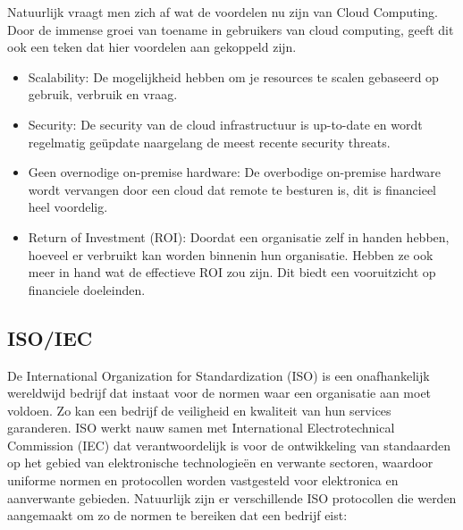 Natuurlijk vraagt men zich af wat de voordelen nu zijn van Cloud Computing. Door de immense groei van toename in gebruikers van cloud computing, geeft dit ook een teken dat hier voordelen aan gekoppeld zijn.

\begin{itemize}
    \item Scalability:
    De mogelijkheid hebben om je resources te scalen gebaseerd op gebruik, verbruik en vraag. \autocite{Mikkola2021}
    \item Security:
    De security van de cloud infrastructuur is up-to-date en wordt regelmatig geüpdate naargelang de meest recente security threats.
    \item Geen overnodige on-premise hardware:
    De overbodige on-premise hardware wordt vervangen door een cloud dat remote te besturen is, dit is financieel heel voordelig.
    \item Return of Investment (ROI):
    Doordat een organisatie zelf in handen hebben, hoeveel er verbruikt kan worden binnenin hun organisatie. Hebben ze ook meer in hand wat de effectieve ROI zou zijn. Dit biedt een vooruitzicht op financiele doeleinden.
\end{itemize}


\subsection{ISO/IEC}

De International Organization for Standardization (ISO) is een onafhankelijk wereldwijd bedrijf dat instaat voor de normen waar een organisatie aan moet voldoen. Zo kan een bedrijf de veiligheid en kwaliteit van hun services garanderen.
ISO werkt nauw samen met International Electrotechnical Commission (IEC) dat verantwoordelijk is voor de ontwikkeling van standaarden op het gebied van elektronische technologieën en verwante sectoren, waardoor uniforme normen en protocollen worden vastgesteld voor elektronica en aanverwante gebieden. \autocite{Florea2016}
Natuurlijk zijn er verschillende ISO protocollen die werden aangemaakt om zo de normen te bereiken dat een bedrijf eist:

